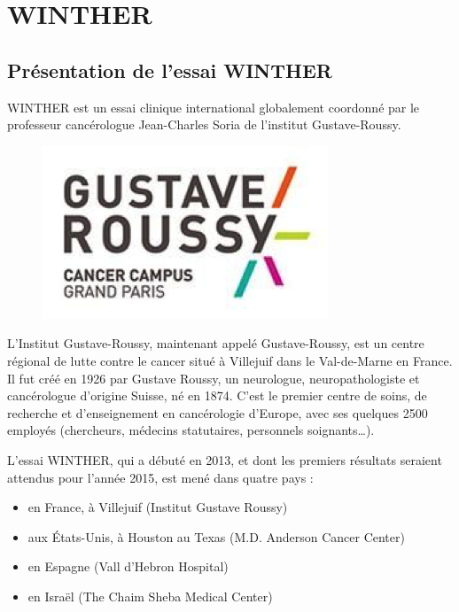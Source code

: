 \documentclass[12pt, openany]{report}
\begin{document}
\section{WINTHER}

\subsection{Présentation de l’essai WINTHER}

WINTHER est un essai clinique international globalement coordonné par le professeur cancérologue Jean-Charles Soria de l’institut Gustave-Roussy. 

 \begin{figure}[H]
\begin{center}
    \includegraphics[scale=1]{Images/im23.png}
\end{center}
\end{figure}

L’Institut Gustave-Roussy, maintenant appelé Gustave-Roussy, est un centre régional de lutte contre le cancer situé à Villejuif dans le Val-de-Marne en France. Il fut créé en 1926 par Gustave Roussy, un neurologue, neuropathologiste et cancérologue d'origine Suisse, né en 1874. C’est le premier centre de soins, de recherche et d'enseignement en cancérologie d’Europe, avec ses quelques 2500 employés (chercheurs, médecins statutaires, personnels soignants…).

 L’essai WINTHER, qui a débuté en 2013, et dont les premiers résultats seraient attendus pour l’année 2015, est mené dans quatre pays : 
\begin{itemize}
\item en France, à Villejuif (Institut Gustave Roussy)
\item aux États-Unis, à Houston au Texas (M.D. Anderson Cancer Center)
\item en Espagne (Vall d’Hebron Hospital)
\item en Israël (The Chaim Sheba Medical Center)
\end{itemize}
\end{document}
